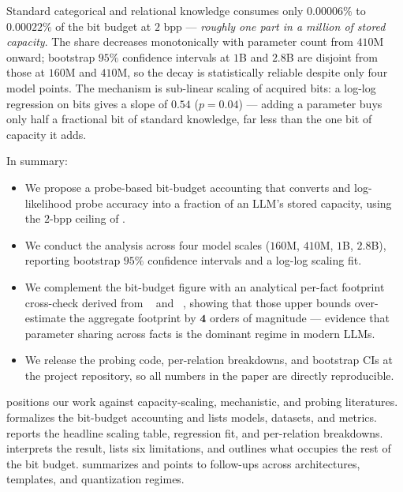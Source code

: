  Standard categorical and relational knowledge consumes only \(\mathbf{0.00006\%}\) to \(\mathbf{0.00022\%}\) of the bit budget at \(2\) bpp --- \emph{roughly one part in a million of stored capacity}. The share decreases monotonically with parameter count from \(410\)M onward; bootstrap \(95\%\) confidence intervals at \(1\)B and \(2.8\)B are disjoint from those at \(160\)M and \(410\)M, so the decay is statistically reliable despite only four model points. The mechanism is sub-linear scaling of acquired bits: a log-log regression on \bear bits gives a slope of \(0.54\) (\(p=0.04\)) --- adding a parameter buys only half a fractional bit of standard knowledge, far less than the one bit of capacity it adds.

 In summary:
\begin{itemize}[leftmargin=*,itemsep=0pt,topsep=0pt]
    \item We propose a probe-based bit-budget accounting that converts \bear and \taxi log-likelihood probe accuracy into a fraction of an LLM's stored capacity, using the \(2\)-bpp ceiling of \citet{allenzhu2024knowledge}.
    \item We conduct the analysis across four \pythia model scales (\(160\)M, \(410\)M, \(1\)B, \(2.8\)B), reporting bootstrap \(95\%\) confidence intervals and a log-log scaling fit.
    \item We complement the bit-budget figure with an analytical per-fact footprint cross-check derived from \kn~\citep{dai2022knowledge} and \rome~\citep{meng2022rome}, showing that those upper bounds over-estimate the aggregate footprint by \(\mathbf{4}\) orders of magnitude --- evidence that parameter sharing across facts is the dominant regime in modern LLMs.
    \item We release the probing code, per-relation breakdowns, and bootstrap CIs at the project repository, so all numbers in the paper are directly reproducible.
\end{itemize}

  positions our work against capacity-scaling, mechanistic, and probing literatures.  formalizes the bit-budget accounting and lists models, datasets, and metrics.  reports the headline scaling table, regression fit, and per-relation breakdowns.  interprets the result, lists six limitations, and outlines what occupies the rest of the bit budget.  summarizes and points to follow-ups across architectures, templates, and quantization regimes.

